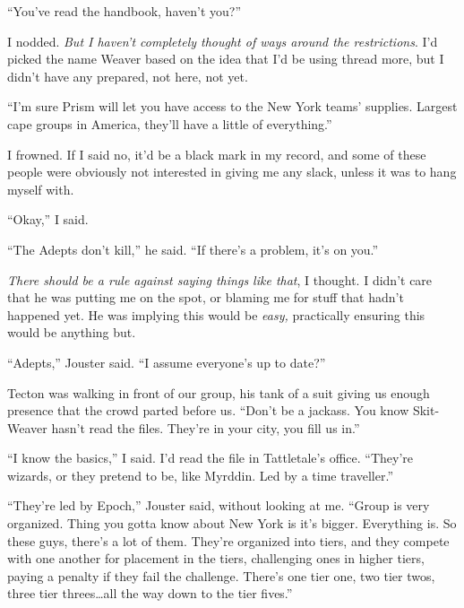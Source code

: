``You've read the handbook, haven't you?''



I nodded.  \emph{But I haven't completely thought of ways around the restrictions}.  I'd picked the name Weaver based on the idea that I'd be using thread more, but I didn't have any prepared, not here, not yet.



``I'm sure Prism will let you have access to the New York teams' supplies.  Largest cape groups in America, they'll have a little of everything.''



I frowned.  If I said no, it'd be a black mark in my record, and some of these people were obviously not interested in giving me any slack, unless it was to hang myself with.



``Okay,'' I said.



``The Adepts don't kill,'' he said.  ``If there's a problem, it's on you.''



\emph{There should be a rule against saying things like that}, I thought.  I didn't care that he was putting me on the spot, or blaming me for stuff that hadn't happened yet.  He was implying this would be \emph{easy, }practically ensuring this would be anything but.



\sectionbreak



``Adepts,'' Jouster said.  ``I assume everyone's up to date?''



Tecton was walking in front of our group, his tank of a suit giving us enough presence that the crowd parted before us.  ``Don't be a jackass.  You know Skit- Weaver hasn't read the files.  They're in your city, you fill us in.''



``I know the basics,'' I said.  I'd read the file in Tattletale's office.  ``They're wizards, or they pretend to be, like Myrddin.  Led by a time traveller.''



``They're led by Epoch,'' Jouster said, without looking at me.  ``Group is very organized.  Thing you gotta know about New York is it's bigger.  Everything is.  So these guys, there's a lot of them.  They're organized into tiers, and they compete with one another for placement in the tiers, challenging ones in higher tiers, paying a penalty if they fail the challenge.  There's one tier one, two tier twos, three tier threes\ldots all the way down to the tier fives.''



